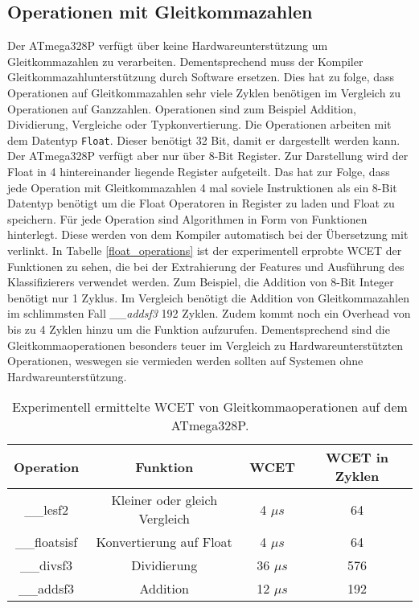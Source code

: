 \subsection{Operationen mit Gleitkommazahlen}
Der ATmega328P verfügt über keine Hardwareunterstützung um Gleitkommazahlen zu verarbeiten. Dementsprechend muss der Kompiler Gleitkommazahlunterstützung durch Software ersetzen. Dies hat zu folge, dass Operationen
auf Gleitkommazahlen sehr viele Zyklen benötigen im Vergleich zu Operationen auf Ganzzahlen. Operationen sind zum Beispiel Addition, Dividierung, Vergleiche oder Typkonvertierung.
\newline
\newline
Die Operationen arbeiten mit dem Datentyp \texttt{Float}. Dieser benötigt 32 Bit, damit er dargestellt werden kann. Der ATmega328P verfügt aber nur über 8-Bit Register. Zur Darstellung wird der Float in 4 hintereinander
liegende Register aufgeteilt. Das hat zur Folge, dass jede Operation mit Gleitkommazahlen 4 mal soviele Instruktionen als ein 8-Bit Datentyp benötigt um die Float Operatoren in Register zu laden und Float zu speichern.
\newline
\newline
Für jede Operation sind Algorithmen in Form von Funktionen hinterlegt. Diese werden von dem Kompiler automatisch bei der Übersetzung mit verlinkt. In Tabelle \ref{float_operations} ist der experimentell erprobte WCET der
Funktionen zu sehen, die bei der Extrahierung der Features und Ausführung des Klassifizierers verwendet werden. Zum Beispiel, die Addition von 8-Bit Integer benötigt nur 1 Zyklus. Im Vergleich benötigt die Addition
von Gleitkommazahlen im schlimmsten Fall \textit{\_\_addsf3} 192 Zyklen. Zudem kommt noch ein Overhead von bis zu 4 Zyklen hinzu um die Funktion aufzurufen. Dementsprechend sind die Gleitkommaoperationen besonders
teuer im Vergleich zu Hardwareunterstützten Operationen, weswegen sie vermieden werden sollten auf Systemen ohne Hardwareunterstützung.
\begin{table}[h!]
    \centering
    \begin{tabular}{ | c | c | c | c |}
        \hline
        Operation & Funktion & WCET & WCET in Zyklen \\\hline
        \_\_lesf2 & Kleiner oder gleich Vergleich & 4 $\mu s$ & 64 \\\hline
        \_\_floatsisf & Konvertierung auf Float & 4 $\mu s$ & 64 \\\hline
        \_\_divsf3 & Dividierung & 36 $\mu s$ & 576 \\\hline
        \_\_addsf3 & Addition & 12 $\mu s$ & 192 \\\hline
    \end{tabular}
    \caption{Experimentell ermittelte WCET von Gleitkommaoperationen auf dem ATmega328P.}
    \label{tab:float_operations}
\end{table}